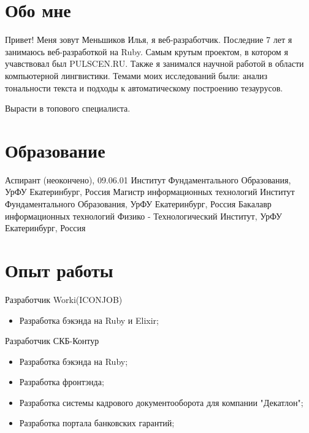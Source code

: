 \documentclass[11pt,a4paper]{moderncv}
\begin{document}
\maketitle

\section{Обо мне}
 {
  Привет! Меня зовут Меньшиков Илья, я веб-разработчик.
}
\cvitem{} {
  Последние 7 лет я занимаюсь веб-разработкой на Ruby. Самым крутым проектом, в котором я учавствовал был PULSCEN.RU.
}
\cvitem{} {
  Также я занимался научной работой в области компьютерной лингвистики. Темами моих исследований были: анализ тональности текста и подходы к автоматическому построению тезаурусов.
}

 {
  Вырасти в топового специалиста.
}


\section{Образование}

  {Аспирант (неокончено), 09.06.01}
  {Институт Фундаментального Образования, УрФУ}
  {Екатеринбург, Россия}
{}{}
  {Магистр информационных технологий}
  {Институт Фундаментального Образования, УрФУ}
  {Екатеринбург, Россия}
{}{}
  {Бакалавр информационных технологий}
  {Физико - Технологический Институт, УрФУ}
  {Екатеринбург, Россия}
{}{}

\section{Опыт работы}

  {Разработчик}{}
  {Worki(ICONJOB)}
  {}
{
\begin{itemize}
  \item Разработка бэкэнда на Ruby и Elixir;
\end{itemize}
}

  {Разработчик}{}
  {СКБ-Контур}
  {}
{
\begin{itemize}
  \item Разработка бэкэнда на Ruby;
  \item Разработка фронтэнда;
  \item Разработка системы кадрового документооборота для компании "Декатлон";
  \item Разработка портала банковских гарантий;
\end{itemize}
}
\end{document}
